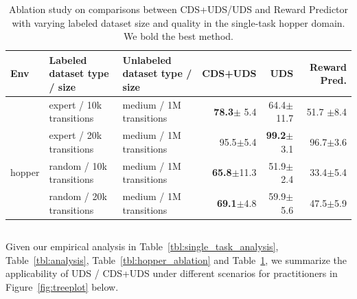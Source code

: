 \begin{table}[t!]
\centering
\footnotesize
\begin{tabular}{l|l|l|rrr}
\toprule
\vspace{-0.08cm}
 \textbf{Env} & \textbf{Labeled dataset type / size} & \textbf{Unlabeled dataset type / size}  & \textbf{CDS+UDS}   & \textbf{UDS}          & \textbf{Reward Pred.} \\
 \midrule
 & expert / 10k transitions & medium / 1M transitions & \textbf{78.3}$\pm$ 5.4 & 64.4$\pm$11.7 & 51.7 $\pm$8.4\\
  & expert / 20k transitions & medium / 1M transitions & 95.5$\pm$5.4 & \textbf{99.2}$\pm$3.1 & 96.7$\pm$3.6\\
 hopper & random / 10k transitions & medium / 1M transitions & \textbf{65.8}$\pm$11.3  & 51.9$\pm$2.4 & 33.4$\pm$5.4\\
 \vspace{-0.08cm}
& random / 20k transitions &medium / 1M transitions  & \textbf{69.1}$\pm$4.8 & 59.9$\pm$5.6 & 47.5$\pm$5.9\\
\bottomrule
\end{tabular}
\caption{\footnotesize Ablation study on comparisons between CDS+UDS/UDS and Reward Predictor with varying labeled dataset size and quality in the single-task hopper domain. We bold the best method.}
\label{tab:reward}
\normalsize
\vspace{-0.54cm}
\end{table}

\subsection{}

Given our empirical analysis in Table~\ref{tbl:single_task_analysis}, Table~\ref{tbl:analysis}, Table~\ref{tbl:hopper_ablation} and Table~\ref{tab:reward}, we summarize the applicability of UDS / CDS+UDS under different scenarios for practitioners in Figure~\ref{fig:treeplot} below.

